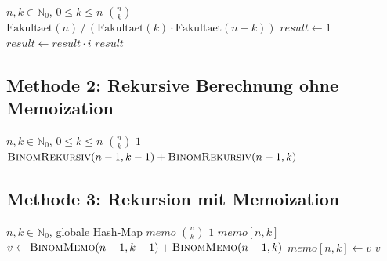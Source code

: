 ﻿\documentclass[12pt, a4paper]{article}
\newcommand{\myN}{\mathbb{N}}
\theoremstyle{plain}
\theoremstyle{definition}
\theoremstyle{remark}
\begin{document}
\begin{algorithm}[H]
  \caption{Binomialkoeffizient via FakultÃ¤tsformel}
  \label{alg:fakultaet}
  \begin{algorithmic}[1]
    \Require $n, k \in \myN_0$, $0 \le k \le n$
    \Ensure $\binom{n}{k}$
      \State \Return $\text{Fakultaet}(n) \,/\, (\text{Fakultaet}(k) \cdot \text{Fakultaet}(n-k))$
    \EndFunction
      \State $result \leftarrow 1$
        \State $result \leftarrow result \cdot i$
      \EndFor
      \State \Return $result$
    \EndFunction
  \end{algorithmic}
\end{algorithm}

\subsection{Methode 2: Rekursive Berechnung ohne Memoization}
\label{subsec:algo_rekursiv}

\begin{algorithm}[H]
  \caption{Binomialkoeffizient rekursiv (ohne Memoization)}
  \label{alg:rekursiv}
  \begin{algorithmic}[1]
    \Require $n, k \in \myN_0$, $0 \le k \le n$
    \Ensure $\binom{n}{k}$
        \State \Return $1$
      \EndIf
      \State \Return $\Call{BinomRekursiv}{n-1, k-1} + \Call{BinomRekursiv}{n-1, k}$
    \EndFunction
  \end{algorithmic}
\end{algorithm}

\subsection{Methode 3: Rekursion mit Memoization}
\label{subsec:algo_memo}

\begin{algorithm}[H]
  \caption{Binomialkoeffizient mit Memoization}
  \label{alg:memo}
  \begin{algorithmic}[1]
    \Require $n, k \in \myN_0$, globale Hash-Map $\textit{memo}$
    \Ensure $\binom{n}{k}$
        \State \Return $1$
      \EndIf
        \State \Return $\textit{memo}[n, k]$
      \EndIf
      \State $v \leftarrow \Call{BinomMemo}{n-1, k-1} + \Call{BinomMemo}{n-1, k}$
      \State $\textit{memo}[n, k] \leftarrow v$
      \State \Return $v$
    \EndFunction
  \end{algorithmic}
\end{algorithm}
\end{document}
